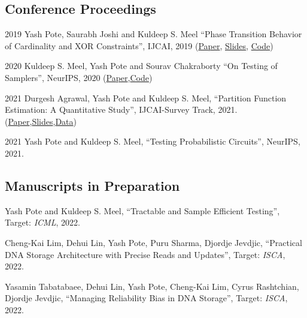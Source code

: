 \documentclass[12pt,letterpaper]{report}
\begin{document}
    \subsection*{Conference Proceedings}

    \begin{tablist}       
        \item[2019] \tab Yash Pote, Saurabh Joshi and Kuldeep S. Meel  \enquote{Phase Transition Behavior of Cardinality and
        XOR Constraints}, IJCAI, 2019 (\href{https://www.ijcai.org/proceedings/2019/0162.pdf}{Paper}, \href{https://meelgroup.github.io/files/slides/ijcai19pjm.pdf}{Slides}, \href{https://github.com/meelgroup/1-CARD-XOR/}{Code})
        
		\item[2020] \tab Kuldeep S. Meel, Yash Pote  and Sourav Chakraborty \enquote{On Testing of Samplers}, NeurIPS, 2020 (\href{https://arxiv.org/abs/2010.12918}{Paper},\href{https://github.com/meelgroup/barbarik}{Code})
		
		\item[2021] \tab  Durgesh Agrawal, Yash Pote  and Kuldeep S. Meel, \enquote{Partition Function Estimation: A Quantitative Study}, IJCAI-Survey Track,  2021.(\href{https://arxiv.org/abs/2105.11132}{Paper},\href{https://meelgroup.github.io/publication/ijcai21_partition}{Slides},\href{t https://doi.org/10.5281/zenodo.
			4769117}{Data})
		
			\item[2021] \tab  Yash Pote  and Kuldeep S. Meel, \enquote{Testing Probabilistic Circuits},  {NeurIPS},  2021.
    \end{tablist}

    \subsection*{Manuscripts in Preparation}

    \begin{tablist}

	

		\item[\the\year] \tab  Yash Pote  and Kuldeep S. Meel, \enquote{Tractable and Sample Efficient Testing}, Target: \textit{ICML},  2022.
		
		\item[\the\year] \tab  Cheng-Kai Lim, Dehui Lin, Yash Pote,  Puru Sharma, Djordje Jevdjic, \enquote{Practical DNA Storage Architecture with Precise Reads and
			Updates}, Target: \textit{ISCA},  2022.
		
		\item[\the\year] \tab  Yasamin Tabatabaee,  Dehui Lin, Yash Pote,  Cheng-Kai Lim, Cyrus Rashtchian, Djordje Jevdjic, \enquote{Managing Reliability Bias in DNA Storage}, Target: \textit{ISCA},  2022.
		

    \end{tablist}
\end{document}
